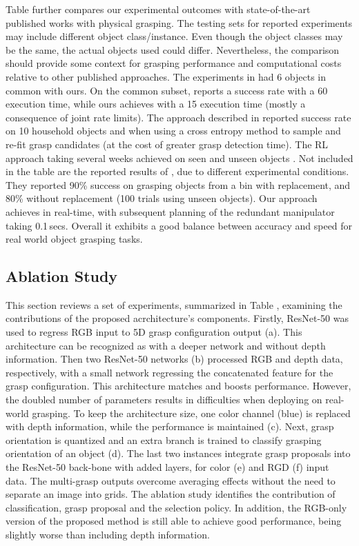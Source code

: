 \documentclass[letterpaper, 10 pt, journal, twoside]{IEEEtran}
\begin{document}
Table  further compares our experimental outcomes 
with state-of-the-art published works with physical grasping.  The testing sets for reported
experiments may include different object class/instance.  Even though
the object classes may be the same, the actual objects used could
differ.  Nevertheless, the comparison should provide some context for
grasping performance and computational costs relative to other published
approaches.
The experiments in \cite{watson2017real} had 6 objects in common with
ours.  On the common subset, \cite{watson2017real} reports a  
success rate with a 60 execution time, while ours achieves 
with a 15 execution time (mostly a consequence of joint rate limits). 
The approach described in \cite{MaEtAl_RSS[2017]} reported 
success rate on 10 household objects and  when using a cross
entropy method \cite{levine2016learning} to sample and re-fit grasp
candidates (at the cost of greater grasp detection time).   
The RL approach taking several weeks achieved  on seen and
unseen objects \cite{pinto2016supersizing}.  
Not included in the table are the reported results of
\cite{levine2016learning}, due to different experimental conditions.
They reported 90\% success on grasping objects from a bin with
replacement, and 80\% without replacement (100 trials using unseen objects).
Our approach achieves  in real-time, with subsequent planning
of the redundant manipulator taking 0.1\,secs.  Overall it exhibits
a good balance between accuracy and speed for real world object grasping
tasks.  

\subsection{Ablation Study}
This section reviews a set of experiments, summarized in Table
, examining the contributions of the proposed
acrchitecture's components. Firstly, ResNet-50 was used to regress RGB 
input to 5D grasp configuration output (a).  This architecture can be
recognized as \cite{redmon2015real} with a deeper network and without depth
information. Then two ResNet-50 networks (b) processed RGB and depth data, 
respectively, with a small network regressing the concatenated feature for
the grasp configuration. 
This architecture matches \cite{kumra2016robotic} and boosts performance. 
However, the doubled number of parameters results in difficulties when
deploying on real-world grasping.  To keep the architecture size, one
color channel (blue) is replaced with depth information, while the performance 
is maintained (c). Next, grasp orientation is quantized and an extra branch is 
trained to classify grasping orientation of an object (d). 
The last two instances integrate grasp proposals into the ResNet-50 back-bone 
with added layers, for color (e) and RGD (f) input data. 
The multi-grasp outputs overcome averaging effects \cite{redmon2015real}
without the need to separate an image into grids. The ablation study identifies the contribution of classification, grasp proposal and the selection policy. In addition, the RGB-only version of
the proposed method is still able to achieve good performance, being
slightly worse than including depth information.
\end{document}
